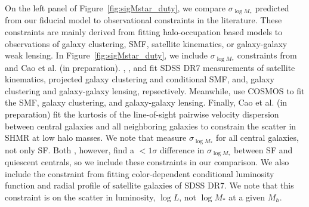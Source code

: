 \documentclass[12pt, letterpaper, preprint, tighten]{aastex62}
\begin{document}
On the left panel of Figure~\ref{fig:sigMstar_duty}, we compare
$\sigma_{\log M_*}$ predicted from our fiducial model to observational
constraints in the literature. These constraints are mainly derived from
fitting halo-occupation based models to observations of galaxy
clustering, SMF, satellite kinematics, or galaxy-galaxy weak lensing. In
Figure~\ref{fig:sigMstar_duty}, we include $\sigma_{\log M_*}$ constraints
from~\cite{more2011, leauthaud2012, reddick2013, tinker2013, zu2015} and
Cao et al. (in preparation). \cite{more2011}, \cite{reddick2013}, and \cite{zu2015}
fit SDSS DR7 measurements of satellite kinematics, projected galaxy clustering and
conditional SMF, and, galaxy clustering and galaxy-galaxy
lensing, repsectively. Meanwhile, \cite{leauthaud2012, tinker2013}
use COSMOS to fit the SMF, galaxy clustering, and galaxy-galaxy lensing.
Finally, Cao et al. (in preparation) fit the kurtosis of the line-of-sight
pairwise velocity dispersion between central galaxies and all neighboring
galaxies to constrain the scatter in SHMR at low halo masses. We note that
\cite{leauthaud2012, reddick2013, zu2015} measure $\sigma_{\log M_*}$ for
all central galaxies, not only SF. Both \cite{more2011, tinker2013},
however, find a $< 1\sigma$ difference in $\sigma_{\log M_*}$ between SF
and quiescent centrals, so we include these constraints in our comparison.
We also include the \cite{lange2018a} constraint from fitting color-dependent
conditional luminosity function and radial profile of satellite galaxies
of SDSS DR7. We note that this constraint is on the scatter in luminosity,
$\log L$, not $\log M_*$ at a given $M_h$.
\end{document}
